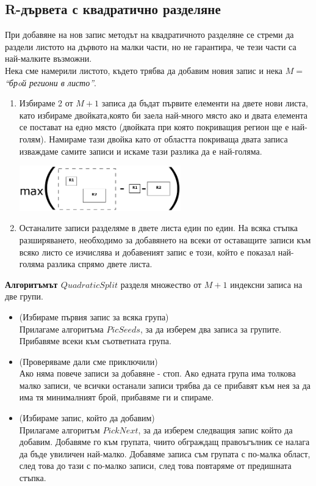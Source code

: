 \documentclass[a4paper,10pt]{article}
\begin{document}
\subsection{R-дървета с квадратично разделяне}
При добавяне на нов запис методът на квадратичното разделяне се стреми да раздели листото на дървото на малки части, 
но не гарантира, че тези части са най-малките възможни. \\
Нека сме намерили листото, където трябва да добавим новия запис и 
нека $M = $ \textit{``брoй региони в листо''}.
\begin{enumerate}
\item Избираме 2 от $M+1$ записа да бъдат първите елементи на двете нови листа, като избираме двойката,която би заела
най-много място ако и двата елемента се постават на едно място (двойката при която покриващия регион ще е най-голям).
Намираме тази двойка като от областта покриваща двата записа изваждаме самите записи и искаме тази разлика да е най-голяма.
\begin{center}
\includegraphics[width=70mm]{Diagram1.png}\end{center}
\item Останалите записи разделяме в двете листа един по един.
На всяка стъпка разширяването, необходимо за добавянето на всеки от оставащите записи към всяко листо се изчислява
и добавеният запис е този, който е показал най-голяма разлика спрямо двете листа.
\end{enumerate}

\textbf{Алгоритъмът $Quadratic Split$} разделя множество от $M+1$ индексни записа на две групи.
\begin{itemize}
 \item (Избираме първия запис за всяка група) \\
Прилагаме алгоритъма $PicSeeds$, за да изберем два записа за групите. Прибавяме всеки към съответната група.
 \item (Проверяваме дали сме приключили) \\
Ако няма повече записи за добавяне - стоп. Ако едната група има толкова малко записи, че всички останали записи трябва да 
се прибавят към нея за да има тя минималният брой, прибавяме ги и спираме.
 \item (Избираме запис, който да добавим) \\
Прилагаме алгоритъм $PickNext$,  за да изберем следващия запис който да добавим. Добавяме го към групата, чиито обграждащ 
правоъгълник се налага да бъде увиличен най-малко. Добавяме записа съм групата с по-малка област, 
след това до тази с по-малко записи, след това повтаряме от предишната стъпка.
\end{itemize}
\end{document}
